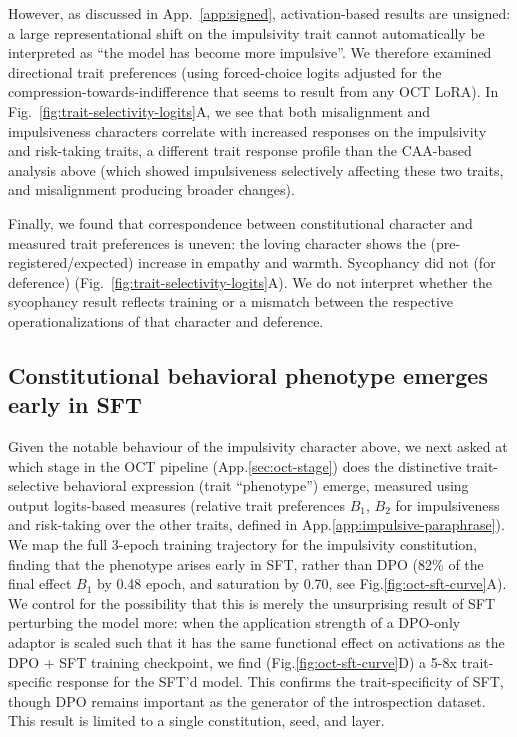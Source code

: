 \documentclass[11pt]{article}
\begin{document}
However, as discussed in App.~\ref{app:signed}, activation-based results are unsigned: a large representational shift on the impulsivity trait cannot automatically be interpreted as ``the model has become more impulsive''. We therefore examined directional trait preferences (using forced-choice logits adjusted for the compression-towards-indifference that seems to result from any OCT LoRA). In Fig.~\ref{fig:trait-selectivity-logits}A, we see that both misalignment and impulsiveness characters correlate with increased responses on the impulsivity and risk-taking traits, a different trait response profile than the CAA-based analysis above (which showed impulsiveness selectively affecting these two traits, and misalignment producing broader changes).

Finally, we found that correspondence between constitutional character and measured trait preferences is uneven: the loving character shows the (pre-registered/expected) increase in empathy and warmth. Sycophancy did not (for deference) (Fig.~\ref{fig:trait-selectivity-logits}A). We do not interpret whether the sycophancy result reflects training or a mismatch between the respective operationalizations of that character and deference.

\subsection{Constitutional behavioral phenotype emerges early in SFT}
\label{sec:results-sft}
Given the notable behaviour of the impulsivity character above, we next asked at which stage in the OCT pipeline (App.\ref{sec:oct-stage}) does the distinctive trait-selective behavioral expression (trait ``phenotype'') emerge, measured using output logits-based measures (relative trait preferences $B_1$, $B_2$ for impulsiveness and risk-taking over the other traits, defined in App.\ref{app:impulsive-paraphrase}). We map the full 3-epoch training trajectory for the impulsivity constitution, finding that the phenotype arises early in SFT, rather than DPO (82\% of the final effect $B_1$ by 0.48 epoch, and saturation by 0.70, see Fig.\ref{fig:oct-sft-curve}A). We control for the possibility that this is merely the unsurprising result of SFT perturbing the model more: when the application strength of a DPO-only adaptor is scaled such that it has the same functional effect on activations as the DPO + SFT training checkpoint, we find (Fig.\ref{fig:oct-sft-curve}D) a 5-8x trait-specific response for the SFT'd model. This confirms the trait-specificity of SFT, though DPO remains important as the generator of the introspection dataset. This result is limited to a single constitution, seed, and layer.
\end{document}
